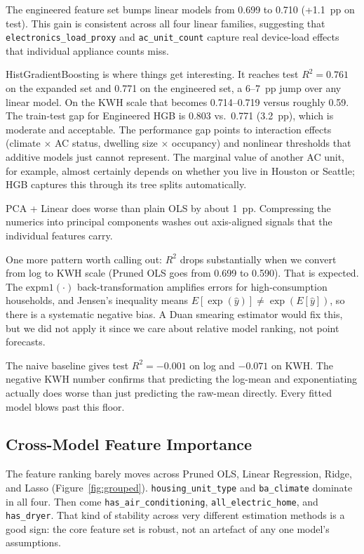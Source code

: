\documentclass[10pt,twocolumn]{article}
\begin{document}
The engineered feature set bumps linear models from 0.699 to 0.710 (+1.1~pp on test). This gain is consistent across all four linear families, suggesting that \texttt{electronics\_load\_proxy} and \texttt{ac\_unit\_count} capture real device-load effects that individual appliance counts miss.

HistGradientBoosting is where things get interesting. It reaches test $R^2 = 0.761$ on the expanded set and 0.771 on the engineered set, a 6--7~pp jump over any linear model. On the KWH scale that becomes 0.714--0.719 versus roughly 0.59. The train-test gap for Engineered HGB is 0.803 vs.\ 0.771 (3.2~pp), which is moderate and acceptable. The performance gap points to interaction effects (climate $\times$ AC status, dwelling size $\times$ occupancy) and nonlinear thresholds that additive models just cannot represent. The marginal value of another AC unit, for example, almost certainly depends on whether you live in Houston or Seattle; HGB captures this through its tree splits automatically.

PCA + Linear does worse than plain OLS by about 1~pp. Compressing the numerics into principal components washes out axis-aligned signals that the individual features carry.

One more pattern worth calling out: $R^2$ drops substantially when we convert from log to KWH scale (Pruned OLS goes from 0.699 to 0.590). That is expected. The $\text{expm1}(\cdot)$ back-transformation amplifies errors for high-consumption households, and Jensen's inequality means $E[\exp(\hat{y})] \neq \exp(E[\hat{y}])$, so there is a systematic negative bias. A Duan smearing estimator would fix this, but we did not apply it since we care about relative model ranking, not point forecasts.

The naive baseline gives test $R^2 = -0.001$ on log and $-0.071$ on KWH. The negative KWH number confirms that predicting the log-mean and exponentiating actually does worse than just predicting the raw-mean directly. Every fitted model blows past this floor.

\subsection{Cross-Model Feature Importance}

The feature ranking barely moves across Pruned OLS, Linear Regression, Ridge, and Lasso (Figure~\ref{fig:grouped}). \texttt{housing\_unit\_type} and \texttt{ba\_climate} dominate in all four. Then come \texttt{has\_air\_conditioning}, \texttt{all\_electric\_home}, and \texttt{has\_dryer}. That kind of stability across very different estimation methods is a good sign: the core feature set is robust, not an artefact of any one model's assumptions.
\end{document}

